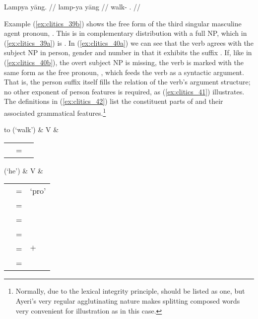 \a\label{ex:clitics_41b}\ljudge{*}\begingl
	\gla Lampya yāng. //
	\glb lamp-ya yāng //
	\glc walk-\TsgM{} \TsgM{}.\Aarg{} //
\endgl
\xe

Example (\ref{ex:clitics_39b}) shows the free form of the third singular
masculine agent pronoun, . This is in complementary
distribution with a full NP, which in (\ref{ex:clitics_39a}) is . In (\ref{ex:clitics_40a}) we can see that the verb agrees
with the subject NP in person, gender and number in that it exhibits the suffix
. If, like in (\ref{ex:clitics_40b}), the overt subject NP is
missing, the verb is marked with the same form as the free pronoun,
, which feeds the verb as a syntactic argument. That is,
the person suffix itself fills the  \Subj{} relation of the verb's argument
structure; no other exponent of person features is required, as
(\ref{ex:clitics_41}) illustrates. The definitions in (\ref{ex:clitics_42})
list the constituent parts of  and their
associated grammatical features.\footnote{Normally, due to the lexical
integrity principle,  should be listed as one, but
Ayeri's very regular agglutinating nature makes splitting composed words very
convenient for illustration as in this case.}

\ex\label{ex:clitics_42}
\begin{tabu} to 
 (`walk')
	&	V
	&	\begin{tabular}[t]{l l l}
			\ups{\Pred}	& = & \astruct{walk}{\ups{\Subj{}}} \\
		\end{tabular}
\end{tabu}\medskip

\begin{tabu} {}
 (`he')
	&	V
	&	\begin{tabular}[t]{l l l}
			\ups{\Subj{} \Pred{}}	& = & `pro' \\
			\ups{\Subj{} \Pers{}}	& = & \Third{} \\
			\ups{\Subj{} \Num{}}	& = & \Sg{} \\
			\ups{\Subj{} \Gend{}}	& = & \M{} \\
			\ups{\Subj{} \Anim{}}	& = & $+$ \\
			\ups{\Subj{} \Case{}}	& = & \Aarg{} \\
		\end{tabular}
\end{tabu}
\xe

